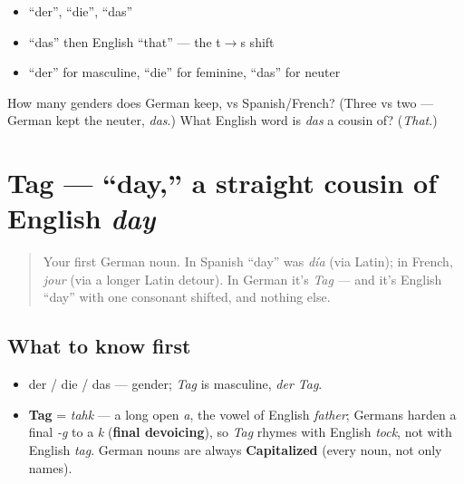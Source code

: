 \begin{itemize}
\raggedright
  \item \textquotedblleft{}der\textquotedblright{}, \textquotedblleft{}die\textquotedblright{}, \textquotedblleft{}das\textquotedblright{}
  \item \textquotedblleft{}das\textquotedblright{} then English \textquotedblleft{}that\textquotedblright{} — the t$\to$s shift
  \item \textquotedblleft{}der\textquotedblright{} for masculine, \textquotedblleft{}die\textquotedblright{} for feminine, \textquotedblleft{}das\textquotedblright{} for neuter
\end{itemize}

\begin{tcolorbox}[breakable,colback=teal!4,colframe=teal!35!black,title={Before you move on}]
How many genders does German keep, vs Spanish/French? (Three vs two — German kept the neuter, \emph{das}.) What English word is \emph{das} a cousin of? (\emph{That}.)
\end{tcolorbox}
\section[Tag]{Tag — \textquotedblleft{}day,\textquotedblright{} a straight cousin of English \emph{day}}

\label{lesson:GE-C01-tag}



\begin{quote}
Your first German noun. In Spanish \textquotedblleft{}day\textquotedblright{} was \emph{día} (via Latin); in French, \emph{jour} (via a longer Latin detour). In German it's \emph{Tag} — and it's English \textquotedblleft{}day\textquotedblright{} with one consonant shifted, and nothing else.
\end{quote}

\subsection*{What to know first}
\begin{itemize}
\raggedright
  \item der / die / das — gender; \emph{Tag} is masculine, \emph{der Tag}.
\end{itemize}

\begin{sounds}
\begin{itemize}
\raggedright
  \item \textbf{Tag} = \emph{tahk} — a long open \emph{a}, the vowel of English \emph{father}; Germans harden a final \emph{-g} to a \emph{k} (\textbf{final devoicing}), so \emph{Tag} rhymes with English \emph{tock}, not with English \emph{tag}. German nouns are always \textbf{Capitalized} (every noun, not only names).
\end{itemize}
\end{sounds}

